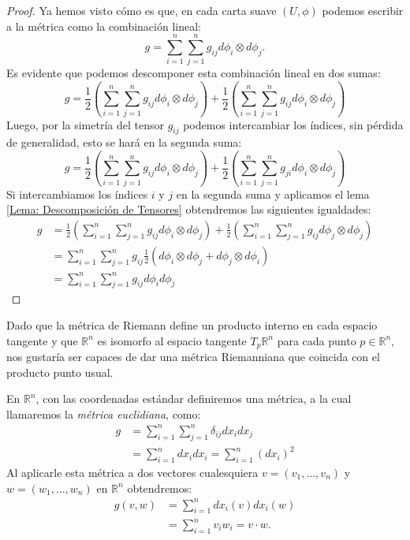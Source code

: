 \begin{proof}
	Ya hemos visto cómo es que, en cada carta suave $(U,\phi)$ podemos escribir a la métrica como la combinación lineal:
	\[
		g = \sum_{i=1}^{n}\sum_{j=1}^{n} g_{ij} d\phi_{i} \otimes d\phi_j.
	\]
	Es evidente que podemos descomponer esta combinación lineal en dos sumas:
	\[
		g = \frac{1}{2}\left(\sum_{i=1}^{n}\sum_{j=1}^{n} g_{ij} d\phi_{i} \otimes d\phi_j \right)
		+ \frac{1}{2}\left(\sum_{i=1}^{n}\sum_{j=1}^{n} g_{ij} d\phi_{i} \otimes d\phi_j \right)
	\]
	Luego, por la simetría del tensor $g_{ij}$ podemos intercambiar los índices, sin pérdida de generalidad, esto se hará en la segunda suma:
	\[
		g = \frac{1}{2}\left(\sum_{i=1}^{n}\sum_{j=1}^{n} g_{ij} d\phi_{i} \otimes d\phi_j \right)
		+ \frac{1}{2}\left(\sum_{i=1}^{n}\sum_{j=1}^{n} g_{ji} d\phi_{i} \otimes d\phi_j \right)
	\]
	Si intercambiamos los índices $i$ y $j$ en la segunda suma y aplicamos el lema \ref{Lema: Descomposición de Tensores} obtendremos las siguientes igualdades:
	\begin{align*}
		g & = \frac{1}{2}\left(\sum_{i=1}^{n}\sum_{j=1}^{n} g_{ij} d\phi_{i} \otimes d\phi_{j} \right)
		+
		\frac{1}{2}\left(\sum_{i=1}^{n}\sum_{j=1}^{n} g_{ij} d\phi_{j} \otimes d\phi_{j} \right)                                      \\
		  & = \sum_{i=1}^{n}\sum_{j=1}^{n} g_{ij} \frac{1}{2} \left( d\phi_{i} \otimes d\phi_{j} + d\phi_{j} \otimes d\phi_{i}\right) \\
		  & = \sum_{i=1}^{n}\sum_{j=1}^{n} g_{ij} d\phi_{i}  d\phi_{j}
	\end{align*}
\end{proof}


\begin{example}
	Dado que la métrica de Riemann define un producto interno en cada espacio tangente y que $\mathbb{R}^{n}$ es isomorfo al espacio tangente $T_{p}\mathbb{R}^{n}$ para cada punto $p \in \mathbb{R}^{n}$, nos gustaría ser capaces de dar una métrica Riemanniana que coincida con el producto punto usual.

  En $\mathbb{R}^{n}$, con las coordenadas estándar definiremos una métrica, a la cual llamaremos la \textit{métrica euclidiana}, como:
	\begin{align*}
		g & = \sum_{i=1}^{n} \sum_{j=1}^{n} \delta_{ij}dx_{i}dx_{j}     \\
		  & = \sum_{i=1}^{n} dx_{i}dx_{i} = \sum_{i=1}^{n} (dx_{i})^{2}
	\end{align*}
	Al aplicarle esta métrica a dos vectores cualesquiera $v = (v_1, \ldots, v_n)$ y $w = (w_1, \ldots, w_n)$ en $\mathbb{R}^{n}$ obtendremos:
	\begin{align*}
		g(v,w) & = \sum_{i=1}^{n} dx_{i}(v)dx_{i}(w)   \\
		       & = \sum_{i=1}^{n} v_i w_i = v \cdot w.
	\end{align*}
\end{example}

